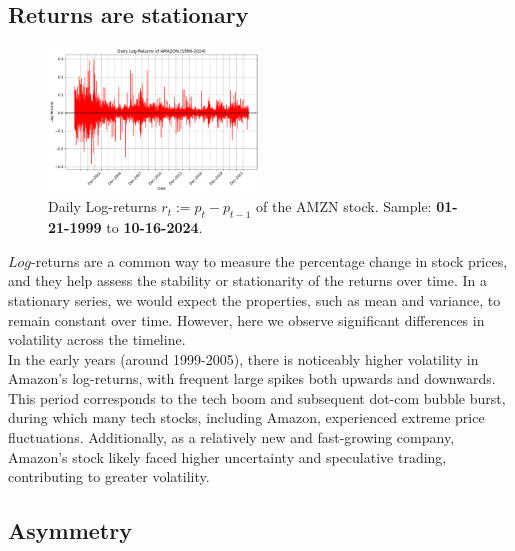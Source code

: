 \documentclass{article}
\begin{document}
\subsection{Returns are stationary}

\begin{figure}[H]
    \centering
    \includegraphics[width=0.5\textwidth]{Img/Daily_Log_Returns.pdf}
    \caption{Daily Log-returns $r_t := p_t - p_{t-1}$ of the AMZN stock.
    Sample: \textbf{01-21-1999} to \textbf{10-16-2024}.}
    \label{fig:Daily_log_returns}
\end{figure}

\noindent $Log$-returns are a common way to measure the percentage change in stock prices, 
and they help assess the stability or stationarity of the returns over time. In a stationary series, we would expect the properties, 
such as mean and variance, to remain constant over time. 
However, here we observe significant differences in volatility across the timeline. \\

\noindent In the early years (around 1999-2005), there is noticeably higher volatility in Amazon's log-returns, 
with frequent large spikes both upwards and downwards. This period corresponds to the tech boom and subsequent dot-com bubble burst, 
during which many tech stocks, including Amazon, experienced extreme price fluctuations. 
Additionally, as a relatively new and fast-growing company, Amazon’s stock likely faced higher uncertainty and speculative trading, 
contributing to greater volatility.

\subsection{Asymmetry}
\end{document}
